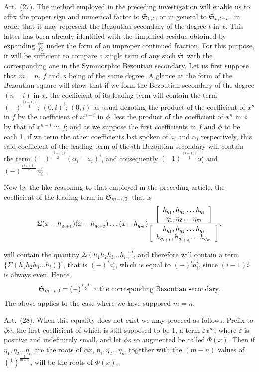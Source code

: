 \documentclass[11pt]{article}
\newcommand{\sourcepage}[1]{\marginpar{\scriptsize p.~#1}}
\newcommand{\art}[1]{\par\smallskip\noindent Art.~(#1).\quad}
\begin{document}
\art{27} The method employed in the preceding investigation will enable us to affix the proper sign and numerical factor to $\mathfrak{S}_{0,t}$, or in general to $\mathfrak{S}_{v,t-v}$, in order that it may represent the Bezoutian secondary of the degree $t$ in $x$. This latter has been already identified with the simplified residue obtained by expanding $\frac{\phi x}{fx}$ under the form of an improper continued fraction. For this purpose, it will be sufficient to compare a single term of any such $\mathfrak{S}$ with the corresponding one in the Symmorphic Bezoutian secondary. Let us first suppose that $m=n$, $f$ and $\phi$ being of the same degree. A glance at the form of the Bezoutian square will show that if we form the Bezoutian secondary of the degree $(n-i)$ in $x$, the coefficient of its leading term will contain the term $(-)^{\frac{(i-1)i}{2}};\ (0,i)^i$; $(0,i)$ as usual denoting the product of the coefficient of $x^n$ in $f$ by the coefficient of $x^{n-i}$ in $\phi$, less the product of the coefficient of $x^n$ in $\phi$ by that of $x^{n-i}$ in $f$; and as we suppose the first coefficients in $f$ and $\phi$ to be each 1, if we term the other coefficients last spoken of $a_i$ and $\alpha_i$ respectively, this said coefficient of the leading term of the $i$th Bezoutian secondary will contain the term $(-)^{\frac{(i-1)i}{2}}(\alpha_i-a_i)^i$, and consequently $(-1)^{\frac{(i-1)i}{2}}\alpha_i^i$ and $(-)^{\frac{i(i+1)}2}a_i^i$.

Now by the like reasoning to that employed in the preceding article, the coefficient of the leading term in $\mathfrak{S}_{m-i,0}$, that is
\[
\Sigma(x-h_{q_{i+1}})(x-h_{q_{i+2}})\ldots(x-h_{q_m})
\frac{\left[\begin{array}{c}h_{q_1},h_{q_2}\ldots h_{q_i}\\\eta_1,\eta_2\ldots\eta_m\end{array}\right]}{\left[\begin{array}{c}h_{q_1},h_{q_2}\ldots h_{q_i}\\h_{q_{i+1}},h_{q_{i+2}}\ldots h_{q_m}\end{array}\right]},
\]

\sourcepage{475}
will contain the quantity $\Sigma(h_1h_2h_3\ldots h_i)^i$, and therefore will contain a term $\{\Sigma(h_1h_2h_3\ldots h_i)\}^i$, that is $(-)^ia_i^i$, which is equal to $(-)^ia_i^i$, since $(i-1)i$ is always even. Hence
\[
\mathfrak{S}_{m-i,0}=(-)^{\frac{i-1}{2}}\times\hbox{the corresponding Bezoutian secondary.}
\]
The above applies to the case where we have supposed $m=n$.

\art{28} When this equality does not exist we may proceed as follows. Prefix to $\phi x$, the first coefficient of which is still supposed to be 1, a term $\varepsilon x^m$, where $\varepsilon$ is positive and indefinitely small, and let $\phi x$ so augmented be called $\Phi(x)$. Then if $\eta_1,\eta_2\ldots\eta_n$ are the roots of $\phi x$, $\eta_1,\eta_2\ldots\eta_n$, together with the $(m-n)$ values of $\left(\frac1\varepsilon\right)^{\frac1{m-n}}$, will be the roots of $\Phi(x)$.
\end{document}
